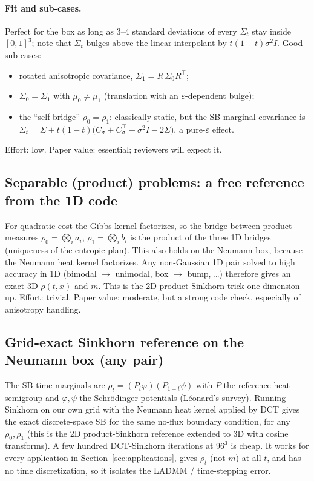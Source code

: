 \documentclass[11pt]{article}
\newcommand{\eps}{\varepsilon}
\begin{document}
\paragraph{Fit and sub-cases.} Perfect for the box as long as $3$--$4$ standard
deviations of every $\Sigma_t$ stay inside $[0,1]^3$; note that $\Sigma_t$ bulges
above the linear interpolant by $t(1-t)\sigma^2 I$. Good sub-cases:
\begin{itemize}
  \item rotated anisotropic covariance, $\Sigma_1=R\,\Sigma_0R^{\top}$;
  \item $\Sigma_0=\Sigma_1$ with $\mu_0\neq\mu_1$ (translation with an $\eps$-dependent bulge);
  \item the ``self-bridge'' $\rho_0=\rho_1$: classically static, but the SB marginal
        covariance is $\Sigma_t=\Sigma+t(1-t)\bigl(C_\sigma+C_\sigma^{\top}+\sigma^2 I-2\Sigma\bigr)$,
        a pure-$\eps$ effect.
\end{itemize}
Effort: low. Paper value: essential; reviewers will expect it.

\subsection{Separable (product) problems: a free reference from the 1D code}

For quadratic cost the Gibbs kernel factorizes, so the bridge between product
measures $\rho_0=\bigotimes_i a_i$, $\rho_1=\bigotimes_i b_i$ is the product of the
three 1D bridges (uniqueness of the entropic plan). This also holds on the Neumann
box, because the Neumann heat kernel factorizes. Any non-Gaussian 1D pair solved to
high accuracy in 1D (bimodal $\to$ unimodal, box $\to$ bump, \dots) therefore gives an
exact 3D $\rho(t,x)$ and $m$. This is the 2D product-Sinkhorn trick one dimension up.
Effort: trivial. Paper value: moderate, but a strong code check, especially of
anisotropy handling.

\subsection{Grid-exact Sinkhorn reference on the Neumann box (any pair)}
\label{sec:dctsinkhorn}

The SB time marginals are $\rho_t=(P_t\varphi)(P_{1-t}\psi)$ with $P$ the reference
heat semigroup and $\varphi,\psi$ the Schr\"odinger potentials (L\'eonard's survey).
Running Sinkhorn on our own grid with the Neumann heat kernel applied by DCT gives
the exact discrete-space SB for the same no-flux boundary condition, for any
$\rho_0,\rho_1$ (this is the 2D product-Sinkhorn reference extended to 3D with cosine
transforms). A few hundred DCT-Sinkhorn iterations at $96^3$ is cheap. It works for
every application in Section~\ref{sec:applications}, gives $\rho_t$ (not $m$) at all
$t$, and has no time discretization, so it isolates the LADMM / time-stepping error.
\end{document}
